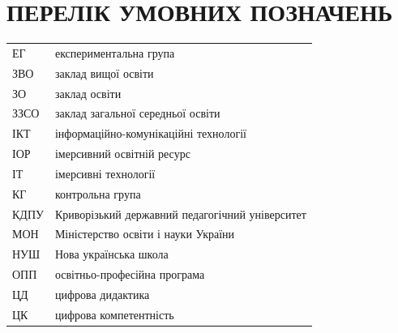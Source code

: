 \section*{\centering ПЕРЕЛІК УМОВНИХ ПОЗНАЧЕНЬ}

\begin{longtable}{@{}p{}p{}@{}}

ЕГ   & експериментальна група \\
ЗВО  & заклад вищої освіти \\
ЗО   & заклад освіти \\
ЗЗСО & заклад загальної середньої освіти \\
ІКТ  & інформаційно-комунікаційні технології \\
ІОР  & імерсивний освітній ресурс \\
ІТ   & імерсивні технології \\
КГ   & контрольна група \\
КДПУ & Криворізький державний педагогічний університет \\
МОН  & Міністерство освіти і науки України \\
НУШ  & Нова українська школа \\
ОПП  & освітньо-професійна програма \\
ЦД   & цифрова дидактика \\
ЦК   & цифрова компетентність \\


\end{longtable}
